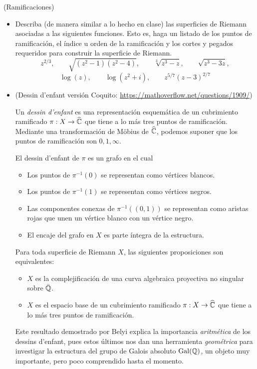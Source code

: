 \begin{exercise}
(Ramificaciones)

\begin{itemize}
    \item Describa (de manera similar a lo hecho en clase) las superficies de Riemann asociadas a las siguientes funciones. Esto es, haga un listado de los puntos de ramificación, el índice u orden de la ramificación y los cortes y pegados requeridos para construir la superficie de Riemann.
    $$z^{2/3}, \qquad \sqrt {(z^2 -1) (z^2 - 4)}, \qquad \sqrt[3] {z^3 - z}, \qquad \sqrt {z^3 - 3z},$$
    $$\log(z), \qquad \log(z^2 + i), \qquad z^{5/7} (z-3)^{2/7}$$
    
    \item (Dessin d'enfant versión Coquito: \url{https://mathoverflow.net/questions/1909/})
    
    Un \textit{dessin d'enfant} es una representación esquemática de un cubrimiento ramificado $\pi : X \to \widehat {\mathbb C}$ que tiene a lo más tres puntos de ramificación. Mediante una transformación de Möbius de $\widehat {\mathbb C}$, podemos suponer que los puntos de ramificación son $0, 1, \infty$.
    
    El dessin d'enfant de $\pi$ es un grafo en el cual
    \begin{itemize}
        \item Los puntos de $\pi^{-1}(0)$ se representan como vértices blancos.
        \item Los puntos de $\pi^{-1}(1)$ se representan como vértices negros.
        \item Las componentes conexas de $\pi^{-1}((0, 1))$ se representan como aristas rojas que unen un vértice blanco con un vértice negro.
        \item El encaje del grafo en $X$ es parte íntegra de la estructura.
    \end{itemize}
    
    Para toda superficie de Riemann $X$, las siguientes proposiciones son equivalentes:
    \begin{itemize}
        \item $X$ es la complejificación de una curva algebraica proyectiva no singular sobre $\bar {\mathbb Q}$.
        \item $X$ es el espacio base de un cubrimiento ramificado $\pi : X \to \widehat {\mathbb C}$ que tiene a lo más tres puntos de ramificación.
    \end{itemize}
    
    Este resultado demostrado por Belyi explica la importancia \textit{aritmética} de los dessins d'enfant, pues estos últimos nos dan una herramienta \textit{geométrica} para investigar la estructura del grupo de Galois absoluto $\operatorname{Gal}(\mathbb Q)$, un objeto muy importante, pero poco comprendido hasta el momento.
    

\end{itemize}
\end{exercise}
